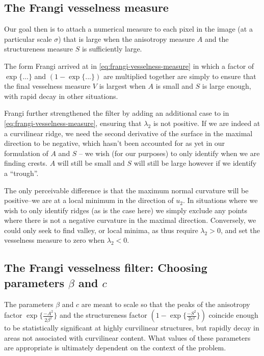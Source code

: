     
    \subsection{The Frangi vesselness measure}
    
    Our goal then is to attach a numerical measure to each pixel in the image (at a particular scale $\sigma$) that is large when the anisotropy measure $A$ and the structureness measure $S$ is sufficiently large.
    
    The form Frangi arrived at in \cref{eq:frangi-vesselness-measure} in which a factor of $\exp\{...\}$ and $(1 - \exp\{...\})$ are multiplied together are simply to ensure that the final vesselness measure $V$ is largest when $A$ is small and $S$ is large enough, with rapid decay in other situations.
    
 Frangi further strengthened the filter by adding an additional case to in \cref{eq:frangi-vesselness-measure}, ensuring that $\lambda_2$ is not positive. If we are indeed at a curvilinear ridge, we need the second derivative of the surface in the maximal direction to be negative, which hasn't been accounted for as yet in our formulation of $A$ and $S$ -- we wish (for our purposes) to only identify when we are finding crests. $A$ will still be small and $S$ will still be large however if we identify a ``trough''.
 
 The only perceivable difference is that the maximum normal curvature will be positive--we are at a local minimum in the direction of $u_2$. In situations where we wish to only identify ridges (as is the case here) we simply exclude any points where there is not a negative curvature in the maximal direction. Conversely, we could only seek to find valley, or local minima, as thus require $\lambda_2 > 0$, and set the vesselness measure to zero when $\lambda_2 < 0$.
    
    \subsection{The Frangi vesselness filter: Choosing parameters $\beta$ and $c$}
    
    The parameters $\beta$ and $c$ are meant to scale so that the peaks of the anisotropy factor $\exp\{\frac{-A^2}{2\beta^2}\}$ and the structureness factor $(1-\exp\{\frac{-S^2}{2c^2}\})$ coincide enough to be statistically significant at highly curvilinear structures, but rapidly decay in areas not associated with curvilinear content. What values of these parameters are appropriate is ultimately dependent on the context of the problem.
    
